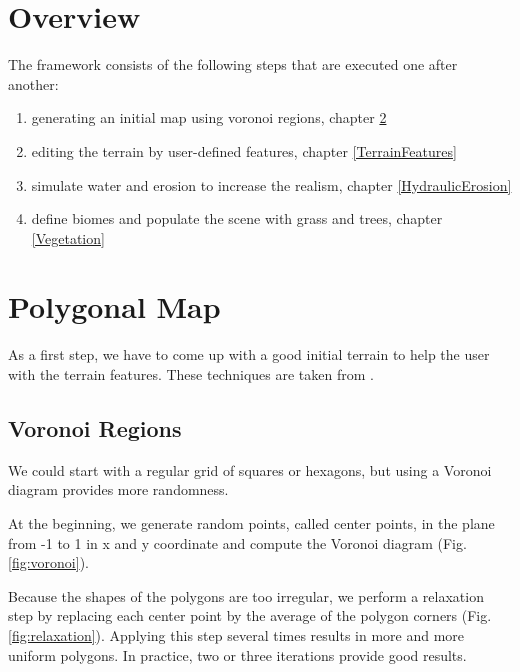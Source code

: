\documentclass[journal, letterpaper]{IEEEtran}
\begin{document}
\section{Overview}
The framework consists of the following steps that are executed one after another:
\begin{enumerate}
	\item generating an initial map using voronoi regions, chapter \ref{PolygonalMap}
	\item editing the terrain by user-defined features, chapter \ref{TerrainFeatures}
	\item simulate water and erosion to increase the realism, chapter \ref{HydraulicErosion}
	\item define biomes and populate the scene with grass and trees, chapter \ref{Vegetation}
\end{enumerate}

\section{Polygonal Map}\label{PolygonalMap}
As a first step, we have to come up with a good initial terrain to help the user with the terrain features.
These techniques are taken from \cite{AmitPatel.2010}.

\subsection{Voronoi Regions}
We could start with a regular grid of squares or hexagons, but using a Voronoi diagram provides more randomness.

At the beginning, we generate random points, called center points, in the plane from -1 to 1 in x and y coordinate and compute the Voronoi diagram (Fig. \ref{fig:voronoi}).

Because the shapes of the polygons are too irregular, we perform a relaxation step by replacing each center point by the average of the polygon corners (Fig. \ref{fig:relaxation}).
Applying this step several times results in more and more uniform polygons. In practice, two or three iterations provide good results.
\end{document}
